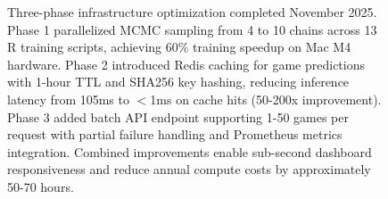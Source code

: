 \begin{figure}[htbp]
\begin{tikzpicture}
\end{tikzpicture}
\caption[Infrastructure Optimization Architecture]{Three-phase infrastructure optimization completed November 2025. Phase 1 parallelized MCMC sampling from 4 to 10 chains across 13 R training scripts, achieving 60\% training speedup on Mac M4 hardware. Phase 2 introduced Redis caching for game predictions with 1-hour TTL and SHA256 key hashing, reducing inference latency from 105ms to $<$1ms on cache hits (50-200x improvement). Phase 3 added batch API endpoint supporting 1-50 games per request with partial failure handling and Prometheus metrics integration. Combined improvements enable sub-second dashboard responsiveness and reduce annual compute costs by approximately 50-70 hours.}
\label{fig:infrastructure-optimization}
\end{figure}
